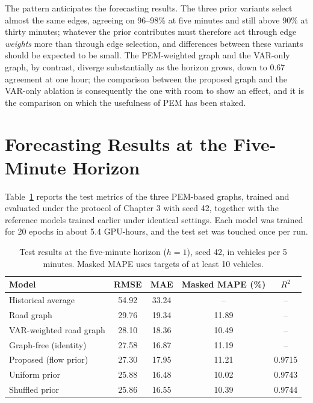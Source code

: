 \documentclass[MTech]{ugthesis}
\begin{document}
The pattern anticipates the forecasting results. The three prior variants select almost the same edges, agreeing on 96--98\% at five minutes and still above 90\% at thirty minutes; whatever the prior contributes must therefore act through edge \emph{weights} more than through edge selection, and differences between these variants should be expected to be small. The PEM-weighted graph and the VAR-only graph, by contrast, diverge substantially as the horizon grows, down to 0.67 agreement at one hour; the comparison between the proposed graph and the VAR-only ablation is consequently the one with room to show an effect, and it is the comparison on which the usefulness of PEM has been staked.

\section{Forecasting Results at the Five-Minute Horizon}
Table~\ref{tab:res5} reports the test metrics of the three PEM-based graphs, trained and evaluated under the protocol of Chapter 3 with seed 42, together with the reference models trained earlier under identical settings. Each model was trained for 20 epochs in about 5.4 GPU-hours, and the test set was touched once per run.

\begin{table}[htpb]
\small
\renewcommand{\arraystretch}{1.4}
\centering
\caption{Test results at the five-minute horizon ($h=1$), seed 42, in vehicles per 5 minutes. Masked MAPE uses targets of at least 10 vehicles.}
\label{tab:res5}
\begin{tabular}{|p{5.2cm}|c|c|c|c|}
\hline
Model & RMSE & MAE & Masked MAPE (\%) & $R^2$ \\ \hline
Historical average & 54.92 & 33.24 & -- & -- \\ \hline
Road graph & 29.76 & 19.34 & 11.89 & -- \\ \hline
VAR-weighted road graph & 28.10 & 18.36 & 10.49 & -- \\ \hline
Graph-free (identity) & 27.58 & 16.87 & 11.19 & -- \\ \hline
Proposed (flow prior) & 27.30 & 17.95 & 11.21 & 0.9715 \\ \hline
Uniform prior & 25.88 & 16.48 & 10.02 & 0.9743 \\ \hline
Shuffled prior & 25.86 & 16.55 & 10.39 & 0.9744 \\ \hline
\end{tabular}
\end{table}
\end{document}
